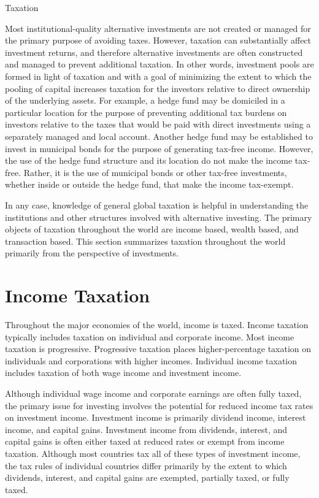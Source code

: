 \documentclass[11pt]{article}
\begin{document}
Taxation

Most institutional-quality alternative investments are not created or managed for the primary purpose of avoiding taxes. However, taxation can substantially affect investment returns, and therefore alternative investments are often constructed and managed to prevent additional taxation. In other words, investment pools are formed in light of taxation and with a goal of minimizing the extent to which the pooling of capital increases taxation for the investors relative to direct ownership of the underlying assets. For example, a hedge fund may be domiciled in a particular location for the purpose of preventing additional tax burdens on investors relative to the taxes that would be paid with direct investments using a separately managed and local account. Another hedge fund may be established to invest in municipal bonds for the purpose of generating tax-free income. However, the use of the hedge fund structure and its location do not make the income tax-free. Rather, it is the use of municipal bonds or other tax-free investments, whether inside or outside the hedge fund, that make the income tax-exempt.

In any case, knowledge of general global taxation is helpful in understanding the institutions and other structures involved with alternative investing. The primary objects of taxation throughout the world are income based, wealth based, and transaction based. This section summarizes taxation throughout the world primarily from the perspective of investments.

\section*{Income Taxation}
Throughout the major economies of the world, income is taxed. Income taxation typically includes taxation on individual and corporate income. Most income taxation is progressive. Progressive taxation places higher-percentage taxation on individuals and corporations with higher incomes. Individual income taxation includes taxation of both wage income and investment income.

Although individual wage income and corporate earnings are often fully taxed, the primary issue for investing involves the potential for reduced income tax rates on investment income. Investment income is primarily dividend income, interest income, and capital gains. Investment income from dividends, interest, and capital gains is often either taxed at reduced rates or exempt from income taxation. Although most countries tax all of these types of investment income, the tax rules of individual countries differ primarily by the extent to which dividends, interest, and capital gains are exempted, partially taxed, or fully taxed.
\end{document}
